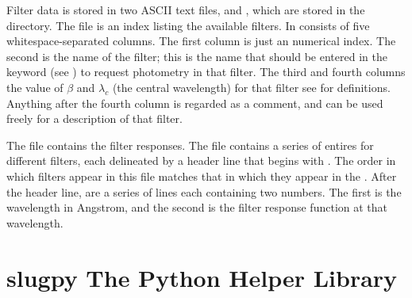 \documentclass[letterpaper,10pt,english]{sphinxmanual}
\begin{document}
Filter data is stored in two ASCII text files,  and , which are stored in the  directory. The  file is an index listing the available filters. In consists of five whitespace-separated columns. The first column is just an numerical index. The second is the name of the filter; this is the name that should be entered in the  keyword (see {\hyperref[\detokenize{parameters:ssec-phot-keywords}]{}}) to request photometry in that filter. The third and fourth columns the value of \(\beta\) and \(\lambda_c\) (the central wavelength) for that filter \textendash{} see {\hyperref[\detokenize{intro:ssec-spec-phot}]{}} for definitions. Anything after the fourth column is regarded as a comment, and can be used freely for a description of that filter.

The  file contains the filter responses. The file contains a series of entires for different filters, each delineated by a header line that begins with \sphinxcode{\#}. The order in which filters appear in this file matches that in which they appear in the . After the header line, are a series of lines each containing two numbers. The first is the wavelength in Angstrom, and the second is the filter response function at that wavelength.


\chapter{slugpy \textendash{} The Python Helper Library}
\label{\detokenize{slugpy:sec-slugpy}}\label{\detokenize{slugpy:slugpy-the-python-helper-library}}\label{\detokenize{slugpy::doc}}
\end{document}
